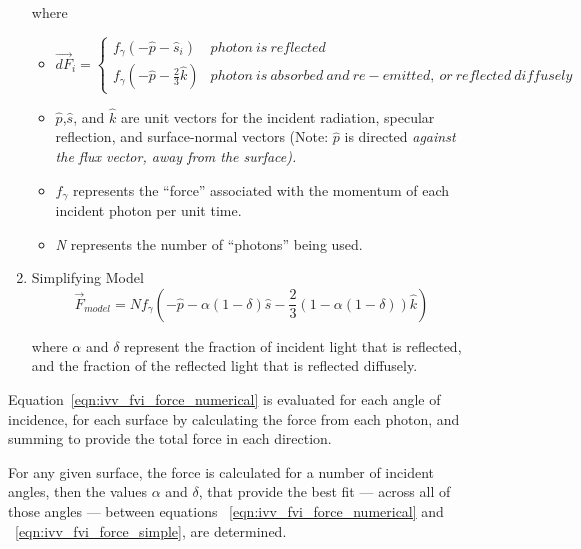 \begin{description}
\begin{enumerate}
          where \newline
          \begin{itemize}
            \item{}
              $\vec{\mathit{dF}}_{i}=
                \begin{cases}
                  f_{\gamma }\left(-\hat{p}-\hat{s}_{i}\right) &
                    \mathit{photon~ is~ reflected}\\
                  f_{\gamma }\left(-\hat{p}-\frac{2}{3}\hat{k}\right) &
                    \mathit{photon~ is~
                    absorbed~and~re-emitted,~or~reflected~diffusely}
                \end{cases}$
            \item{}
              $\hat{p}$,$\hat{s}$, and $\hat{k}$ are unit vectors for the
              incident radiation, specular reflection, and surface-normal
              vectors (Note:  $\hat{p}$ is directed \it against \rm the flux
              vector, away from the surface).
            \item{}
              $f_{\gamma }$ represents the ``force'' associated with the
              momentum of each incident photon per unit time.
            \item{}
              \textit{N} represents the number of ``photons'' being
              used.
          \end{itemize}

        \item{}Simplifying Model
          \begin{equation}
            {\vec{F}}_{\mathit{model}}=Nf_{\gamma }\left(-\hat{p}-\alpha
            (1-\delta)\hat{s}-\frac{2}{3}(1-\alpha (1-\delta ))\hat{k}\right)
            \label{eqn:ivv_fvi_force_simple}
          \end{equation}

          where  $\alpha $ and  $\delta $ represent the fraction of incident
          light that is reflected, and the fraction of the reflected
          light that is reflected diffusely.

      \end{enumerate}
      Equation~\ref{eqn:ivv_fvi_force_numerical} is evaluated
      for each angle of incidence, for each surface by calculating the force
      from each photon, and summing to provide the total force in
      each direction.

      For any given surface, the force is calculated for a number of incident
      angles, then the values  $\alpha $ and  $\delta $,  that provide the
      best fit ---  across all of those angles --- between
      equations ~\ref{eqn:ivv_fvi_force_numerical}
      and ~\ref{eqn:ivv_fvi_force_simple}, are
      determined.


\end{description}
